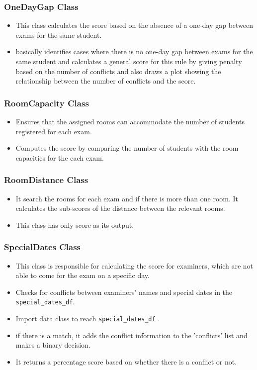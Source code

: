 \subsubsection{OneDayGap Class}


\begin{itemize}
\item This class calculates the score based on the absence of a one-day gap between exams for the same student.
\item basically identifies cases where there is no one-day gap between exams for the same student and calculates a general score for this rule by giving penalty based on the number of conflicts and also draws a plot showing the relationship between the number of conflicts and the score.
\end{itemize}

\subsubsection{RoomCapacity Class}


\begin{itemize}
\item Ensures that the assigned rooms can accommodate the number of students registered for each exam.
\item Computes the score by comparing the number of students with the room capacities for the each exam.
\end{itemize}

\subsubsection{RoomDistance Class}


\begin{itemize}
\item It search the rooms for each exam and if there is more than one room. It calculates the sub-scores of the distance between the relevant rooms.
\item This class has only score as its output.
\end{itemize}

\subsubsection{SpecialDates Class}


\begin{itemize}
\item This class is responsible for calculating the score for examiners, which are not able to come for the exam on a specific day.
\item Checks for conflicts between examiners' names and special dates in the \verb|special_dates_df|.
\item Import data class to reach \verb|special_dates_df| .
\item if there is a match, it adds the conflict information to the 'conflicts' list and makes a binary decision.
\item It returns a percentage score based on whether there is a conflict or not.
\end{itemize}

